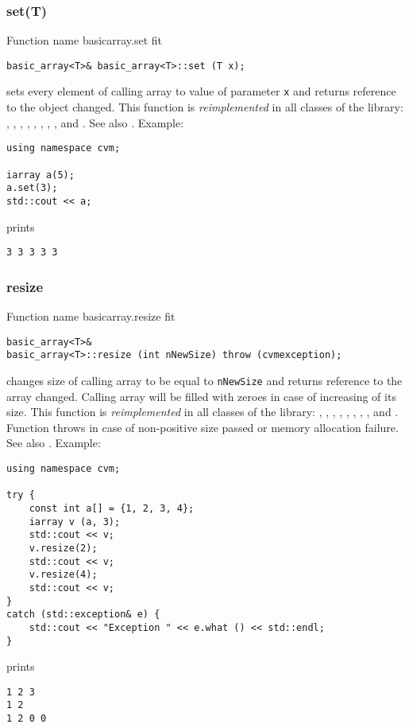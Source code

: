 \subsubsection{set(T)}
Function%
\pdfdest name {basicarray.set} fit
\begin{verbatim}
basic_array<T>& basic_array<T>::set (T x);
\end{verbatim}
sets every element of  calling array to  value of
parameter \verb"x"
and returns  reference to the object changed.
This function is \emph{reimplemented} in all classes of the library:
,  ,
,   ,
, ,
, ,
 and .
See also .
Example:
\begin{Verbatim}
using namespace cvm;

iarray a(5);
a.set(3);
std::cout << a;
\end{Verbatim}
prints
\begin{Verbatim}
3 3 3 3 3
\end{Verbatim}
\newpage


\subsubsection{resize}
Function%
\pdfdest name {basicarray.resize} fit
\begin{verbatim}
basic_array<T>&
basic_array<T>::resize (int nNewSize) throw (cvmexception);
\end{verbatim}
changes  size of  calling array to be equal to
\verb"nNewSize" and returns  reference to
the array changed. Calling array
will be filled with zeroes in case of increasing of its size.
This function is \emph{reimplemented} in all classes of the library:
,  ,
,   ,
, ,
, ,
 and .
Function throws 
in case of non-positive size passed or memory allocation failure.
See also .
Example:
\begin{Verbatim}
using namespace cvm;

try {
    const int a[] = {1, 2, 3, 4};
    iarray v (a, 3);
    std::cout << v;
    v.resize(2);
    std::cout << v;
    v.resize(4);
    std::cout << v;
}
catch (std::exception& e) {
    std::cout << "Exception " << e.what () << std::endl;
}
\end{Verbatim}
prints
\begin{Verbatim}
1 2 3
1 2
1 2 0 0
\end{Verbatim}
\newpage



